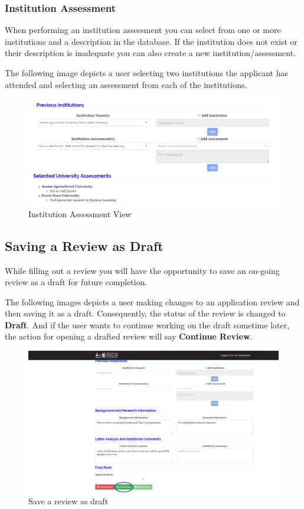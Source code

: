 \documentclass[fontsize=12pt,paper=letter,twoside]{scrartcl}
\begin{document}
\subsubsection{Institution Assessment}
When performing an institution assessment you can select from one or more institutions and a description in the database. If the institution does not exist or their description is inadequate you can also create a new institution/assessment.

\bigskip
\noindent The following image depicts a user selecting two institutions the applicant has attended and selecting an assessment from each of the institutions.

\begin{figure}[!htb]
\begin{center}
\includegraphics[width=.7\textwidth]{images/uni_assessment.png}
\end{center}
\caption{Institution Assessment View}
\label{fig:uni_assessment}
\end{figure}

\clearpage
\newpage
\subsection{Saving a Review as Draft}
While filling out a review you will have the opportunity to save an on-going review as a draft for future completion.

\bigskip
\noindent The following images depicts a user making changes to an application review and then saving it as a draft. Consequently, the status of the review is changed to \textbf{Draft}. And if the user wants to continue working on the draft sometime later, the action for opening a drafted review will say \textbf{Continue Review}.

\begin{figure}[!htb]
\begin{center}
\includegraphics[width=.9\textwidth]{images/save_as_draft_review.png}
\end{center}
\caption{Save a review as draft}
\label{fig:save_as_draft_review}
\end{figure}
\end{document}
